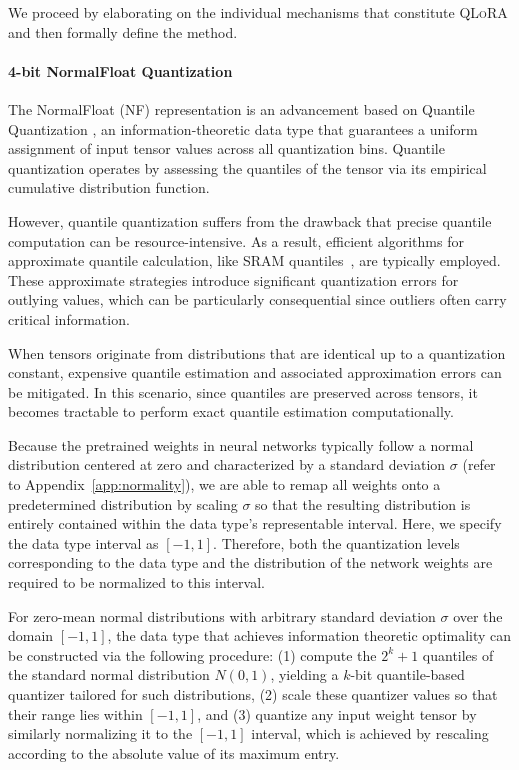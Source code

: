 We proceed by elaborating on the individual mechanisms that constitute \textsc{QLoRA} and then formally define the method.

\paragraph{4-bit NormalFloat Quantization} The NormalFloat (NF) representation is an advancement based on Quantile Quantization \citep{dettmers2022optimizers}, an information-theoretic data type that guarantees a uniform assignment of input tensor values across all quantization bins. Quantile quantization operates by assessing the quantiles of the tensor via its empirical cumulative distribution function.

However, quantile quantization suffers from the drawback that precise quantile computation can be resource-intensive. As a result, efficient algorithms for approximate quantile calculation, like SRAM quantiles~\citep{dettmers2022optimizers}, are typically employed. These approximate strategies introduce significant quantization errors for outlying values, which can be particularly consequential since outliers often carry critical information.

When tensors originate from distributions that are identical up to a quantization constant, expensive quantile estimation and associated approximation errors can be mitigated. In this scenario, since quantiles are preserved across tensors, it becomes tractable to perform exact quantile estimation computationally.

Because the pretrained weights in neural networks typically follow a normal distribution centered at zero and characterized by a standard deviation $\sigma$ (refer to Appendix~\ref{app:normality}), we are able to remap all weights onto a predetermined distribution by scaling $\sigma$ so that the resulting distribution is entirely contained within the data type’s representable interval. Here, we specify the data type interval as $[-1, 1]$. Therefore, both the quantization levels corresponding to the data type and the distribution of the network weights are required to be normalized to this interval.

For zero-mean normal distributions with arbitrary standard deviation $\sigma$ over the domain $[-1, 1]$, the data type that achieves information theoretic optimality can be constructed via the following procedure: (1) compute the $2^k+1$ quantiles of the standard normal distribution $N(0,1)$, yielding a $k$-bit quantile-based quantizer tailored for such distributions, (2) scale these quantizer values so that their range lies within $[-1, 1]$, and (3) quantize any input weight tensor by similarly normalizing it to the $[-1, 1]$ interval, which is achieved by rescaling according to the absolute value of its maximum entry.

